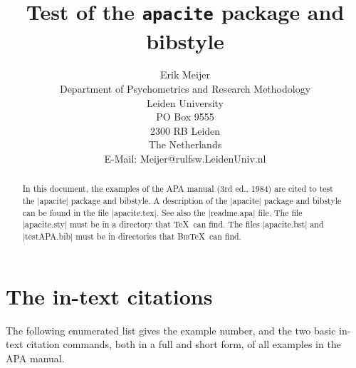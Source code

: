 \documentclass[12pt,a4paper]{article}
\title{Test of the \texttt{apacite} package and bibstyle}
\author{Erik Meijer\\
        Department of Psychometrics and Research Methodology\\
        Leiden University\\
        PO Box 9555\\
        2300 RB Leiden\\
        The Netherlands\\
        E-Mail: Meijer@rulfsw.LeidenUniv.nl
}
\begin{document}
\maketitle
\begin{abstract}
   In this document, the examples of the APA manual (3rd ed., 1984)
   are cited to test the |apacite| package and bibstyle. 
   A description of the |apacite| package and bibstyle can be found
   in the file |apacite.tex|. See also the |readme.apa| file.
   The file |apacite.sty| must be in a directory that \TeX\ can find.
   The files |apacite.bst| and |testAPA.bib| must be in directories
   that \textsc{Bib}\TeX\ can find.
\end{abstract}
\section{The in-text citations}
The following enumerated list gives the example number, and
the two basic in-text citation commands, both in a full and
short form, of all examples in the APA manual. 
\end{document}
